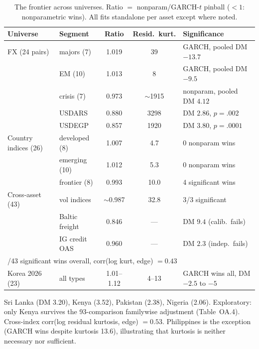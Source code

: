 \documentclass[11pt]{article}
\begin{document}
\begin{table}[htbp]
\centering
\begin{threeparttable}
\caption{The frontier across universes. Ratio $=$
nonparam/GARCH-$t$ pinball ($<1$: nonparametric wins). All fits
standalone per asset except where noted.}
\label{tab:universes}
\footnotesize\setlength{\tabcolsep}{4pt}
\begin{tabular}{llccl}
\toprule
Universe & Segment & Ratio & Resid.\ kurt. & Significance \\
\midrule
FX (24 pairs) & majors (7) & 1.019 & 39 & GARCH, pooled DM $-13.7$ \\
 & EM (10) & 1.013 & 8 & GARCH, pooled DM $-9.5$ \\
 & crisis (7) & 0.973 & $\sim$1915 & nonparam, pooled DM $4.12$ \\
 & \quad USDARS & 0.880 & 3298 & DM $2.86$, $p=.002$ \\
 & \quad USDEGP & 0.857 & 1920 & DM $3.80$, $p=.0001$ \\
\midrule
Country indices (26) & developed (8) & 1.007 & 4.7 & 0 nonparam wins \\
 & emerging (10) & 1.012 & 5.3 & 0 nonparam wins \\
 & frontier (8) & 0.993 & 10.0 & 4 significant wins\tnote{a} \\
\midrule
Cross-asset (43) & vol indices & $\sim$0.987 & 32.8 & 3/3 significant \\
 & Baltic freight & 0.846 & --- & DM $9.4$ (calib.\ fails) \\
 & IG credit OAS & 0.960 & --- & DM $2.3$ (indep.\ fails) \\
\multicolumn{5}{l}{\quad 13/43 significant wins overall, corr(log kurt, edge) $= 0.43$} \\
\midrule
Korea 2026 (23) & all types & 1.01--1.12 & 4--13 & GARCH wins all, DM $-2.5$ to $-5$ \\
\bottomrule
\end{tabular}
\begin{tablenotes}\footnotesize
\item[a] Sri Lanka (DM 3.20), Kenya (3.52), Pakistan (2.38), Nigeria (2.06). Exploratory: only Kenya survives the 93-comparison
familywise adjustment (Table~OA.4). Cross-index corr(log residual kurtosis, edge) $= 0.53$.
Philippines is the exception (GARCH wins despite kurtosis 13.6),
illustrating that kurtosis is neither necessary nor sufficient.
\end{tablenotes}
\end{threeparttable}
\end{table}
\end{document}
